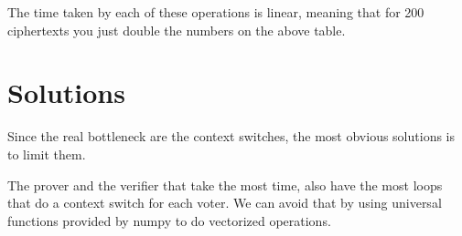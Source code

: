 \documentclass{article}
\begin{document}
The time taken by each of these operations is linear, meaning that for
200 ciphertexts you just double the numbers on the above table.

\section{Solutions}

Since the real bottleneck are the context switches, the most obvious
solutions is to limit them. 

The prover and the verifier that take the most time, also have the
most loops that do a context switch for each voter. We can avoid that
by using universal functions provided by numpy\cite{numpy} to do
vectorized operations.




\end{document}
